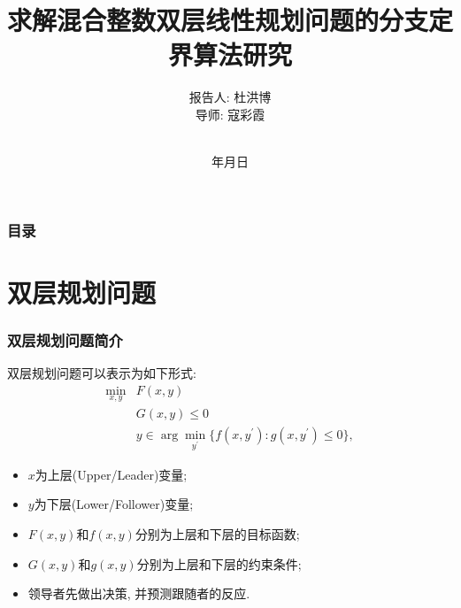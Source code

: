 \documentclass[10pt]{beamer}
\renewcommand{\today}{\number\year 年\number\month 月\number\day 日}
\begin{document}
\justifying
\title[求解混合整数双层线性规划问题的分支定界算法研究]%
{求解混合整数双层线性规划问题的分支定界算法研究}

\author[杜洪博]%
{报告人: 杜洪博\\
导\quad 师: 寇彩霞\rule[0pt]{0pt}{20pt}\\}

\institute[BUPT]{\textcolor[rgb]{0.0,0.0,0.10}%
{\small\ttfamily 北京邮电大学\ 理学院\\[10pt]}}

\date{\today}

\begin{frame}[plain]
	\titlepage
\end{frame}

\begin{frame}
	\frametitle{目录}
	\tableofcontents[hideallsubsections] %
\end{frame}

\AtBeginSection[] %
{ \begin{frame}<beamer> %
		\tableofcontents[currentsection,hideallsubsections]%
	\end{frame}
}


\section{双层规划问题}

\begin{frame}
	\frametitle{双层规划问题简介}
	双层规划问题可以表示为如下形式: 
	\begin{equation}
		\begin{aligned}
			\min_{x,y}& F(x,y)  \\
			&G(x,y)\leq0 \\
			&y\in\arg\operatorname*{min}_{y^{\prime}}\{f(x,y^{\prime}):g(x,y^{\prime})\leq0\},
		\end{aligned}
	\end{equation}
	\begin{itemize}
		\item $x$为上层(Upper/Leader)变量;
		\item $y$为下层(Lower/Follower)变量;
		\item $F(x,y)$和$f(x,y)$分别为上层和下层的目标函数;
		\item $G(x,y)$和$g(x,y)$分别为上层和下层的约束条件;
		\item 领导者先做出决策, 并预测跟随者的反应.
	\end{itemize}
\end{frame}
\end{document}
